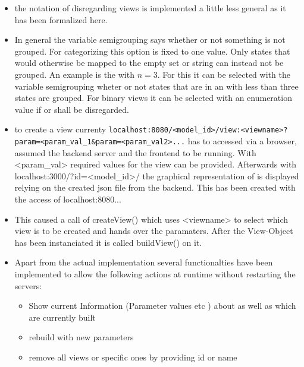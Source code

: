 \documentclass[preview]{standalone}
\begin{document}
\begin{itemize}
		\item the notation of disregarding views is implemented a little less general as it has been formalized here.
		\item In general the variable semigrouping says whether or not something is not grouped. For categorizing \viewsN this option is fixed to one value. Only states that would otherwise be mapped to the empty set or string can instead not be grouped. An example is the \viewN \viewscc with $n = 3$. For this \viewN it can be selected with the variable semigrouping wheter or not states that are in an \sccN with less than three states are grouped. For binary views it can be selected with an enumeration value if \hasppty or \notppty shall be disregarded.
		
		\item \sloppy to create a view currenty 
		\texttt{localhost:8080/<model\_id>/view:<viewname>?param=<param\_val\_1\&param=<param\_val2>...} has to accessed via a browser, assumed the backend server and the frontend to be running. With <param\_val> required values for the view can be provided. Afterwards with localhost:3000/?id=<model\_id>/ the graphical representation of \viewN is displayed relying on the created json file from the backend. This has been created with the access of localhost:8080...
		\item This caused a call of createView() which uses <viewname> to select which view is to be created and hands over the paramaters. After the View-Object has been instanciated it is called buildView() on it.
		\item Apart from the actual implementation several functionalties have been implemented to allow the following actions at runtime without restarting the servers:
		\begin{itemize}
			\item Show current Information (Parameter values etc ) about \viewN as well as which \viewsN are currently built
			\item rebuild \viewN with new parameters
			\item remove all views or specific ones by providing id or name		
		\end{itemize}
		

\end{itemize}
\end{document}
